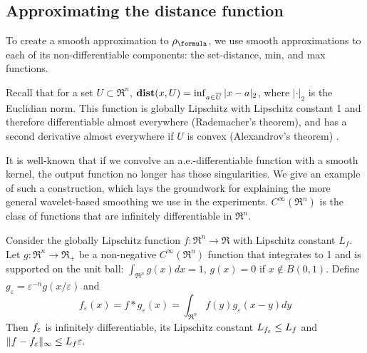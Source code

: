 \subsection{Approximating the distance function}
\label{sec:dist smoothing}
To create a smooth approximation to $\robf$, we use smooth approximations to each of its non-differentiable components: the set-distance, min, and max functions.

Recall that for a set $U \subset \Re^n$, $\mathbf{dist}(x,U) = \inf_{a \in \overline{U}} |x-a|_2$, where $|\cdot|_2$ is the Euclidian norm.
This function is globally Lipschitz with Lipschitz constant 1 and therefore differentiable almost everywhere (Rademacher's theorem), and has a second derivative almost everywhere if $U$ is convex (Alexandrov's theorem) \cite{MakelaN92book}.

It is well-known that if we convolve an a.e.-differentiable function with a smooth kernel, the output function no longer has those singularities.
We give an example of such a construction, which lays the groundwork for explaining the more general wavelet-based smoothing we use in the experiments.
$C^\infty(\Re^n)$ is the class of functions that are infinitely differentiable in $\Re^n$.
\begin{theorem}
	\label{thm:ge smoothing}
	Consider the globally Lipschitz function $f:\Re^n \rightarrow \Re$ with Lipschitz constant $L_f$.
	Let $g: \Re^n \rightarrow \Re_+$ be a non-negative $C^\infty(\Re^n)$ function that integrates to 1 and is supported on the unit ball:
	$\int_{\Re^n}g(x)dx = 1$, $g(x) = 0$ if $x \notin B(0,1)$.
	Define $g_\varepsilon = \varepsilon^{-n}g(x/\varepsilon)$ and
	\[f_\varepsilon(x) = f *g_\varepsilon(x) = \int_{\Re^n}f(y)g_\varepsilon(x-y)dy\]
	Then $f_\varepsilon$ is infinitely differentiable, its Lipschitz constant $L_{f_\varepsilon} \leq L_f$ and $\|f-f_\varepsilon\|_\infty \leq L_f \varepsilon$.
\end{theorem}
